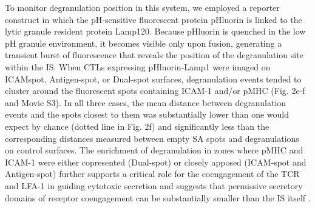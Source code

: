 To monitor degranulation position in this system, we employed a reporter construct in which the pH-sensitive fluorescent protein pHluorin is linked to the lytic granule resident protein Lamp120. Because pHluorin is quenched in the low pH granule environment, it becomes visible only upon fusion, generating a transient burst of fluorescence that reveals the position of the degranulation site within the IS. When CTLs expressing pHluorin-Lamp1 were imaged on ICAMspot, Antigen-spot, or Dual-spot surfaces, degranulation events tended to cluster around the fluorescent spots containing ICAM-1 and/or pMHC (Fig. 2e-f and Movie S3). In all three cases, the mean distance between degranulation events and the spots closest to them was substantially lower than one would expect by chance (dotted line in Fig. 2f) and significantly less than the corresponding distances measured between empty SA spots and degranulations on control surfaces. The enrichment of degranulation in zones where pMHC and ICAM-1 were either copresented (Dual-spot) or closely apposed (ICAM-spot and Antigen-spot) further supports a critical role for the coengagement of the TCR and LFA-1 in guiding cytotoxic secretion and suggests that permissive secretory domains of receptor coengagement can be substantially smaller than the IS itself \cite{Verron2021}.


